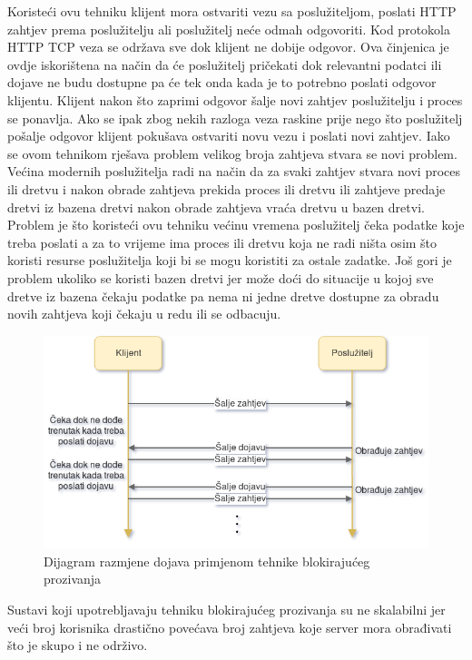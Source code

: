\documentclass[times, utf8, zavrsni]{fer}
\begin{document}
Koristeći ovu tehniku klijent mora ostvariti vezu sa poslužiteljom, poslati HTTP zahtjev prema poslužitelju ali poslužitelj neće odmah odgovoriti. Kod protokola HTTP TCP veza se održava sve dok klijent ne dobije odgovor. Ova činjenica je ovdje iskorištena na način da će poslužitelj pričekati dok relevantni podatci ili dojave ne budu dostupne pa će tek onda kada je to potrebno poslati odgovor klijentu. Klijent nakon što zaprimi odgovor šalje novi zahtjev poslužitelju i proces se ponavlja. Ako se ipak zbog nekih razloga veza raskine prije nego što poslužitelj pošalje odgovor klijent pokušava ostvariti novu vezu i poslati novi zahtjev. Iako se ovom tehnikom rješava problem velikog broja zahtjeva stvara se novi problem. Većina modernih poslužitelja radi na način da za svaki zahtjev stvara novi proces ili dretvu i nakon obrade zahtjeva prekida proces ili dretvu ili zahtjeve predaje dretvi iz bazena dretvi nakon obrade zahtjeva  vraća dretvu u bazen dretvi. Problem je što koristeći ovu tehniku većinu vremena poslužitelj čeka podatke koje treba poslati a za to vrijeme ima proces ili dretvu koja ne radi ništa osim što koristi resurse poslužitelja koji bi se mogu koristiti za ostale zadatke. Još gori je problem ukoliko se koristi bazen dretvi jer može doći do situacije u kojoj sve dretve iz bazena čekaju podatke pa nema ni jedne dretve dostupne za obradu novih zahtjeva koji čekaju u redu ili se odbacuju.

\begin{figure}[htb]
\centering
\includegraphics[width=\linewidth]{img/long-polling.png}
\caption{Dijagram razmjene dojava primjenom tehnike blokirajućeg prozivanja}
\label{fig:long-polling-image}
\end{figure}

Sustavi koji upotrebljavaju tehniku blokirajućeg prozivanja su ne skalabilni jer veći broj korisnika drastično povećava broj zahtjeva koje server mora obrađivati što je skupo i ne održivo. 
\end{document}
